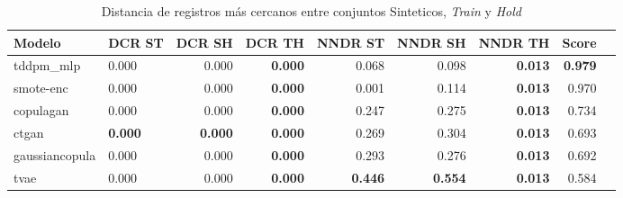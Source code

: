 \begin{table}[H]
\centering
\caption{Distancia de registros más cercanos entre conjuntos Sinteticos, \emph{Train} y \emph{Hold}}
\label{table-dcr-economicos-a-3}
\begin{tabular}{|l|l|r|r|r|r|r|r|r|}
\hline
\rowcolor[gray]{0.8}
Modelo & DCR ST & DCR SH & DCR TH & NNDR ST & NNDR SH & NNDR TH & \textbf{Score} \\
\hline tddpm\_mlp & 0.000 & \cellcolor[rgb]{0.9, 0.54, 0.52} 0.000 & \bfseries 0.000 & 0.068 & 0.098 & \bfseries 0.013 & \bfseries 0.979 \\
\hline smote-enc & \cellcolor[rgb]{0.9, 0.54, 0.52} 0.000 & 0.000 & \bfseries 0.000 & 0.001 & 0.114 & \bfseries 0.013 & 0.970 \\
\hline copulagan & 0.000 & 0.000 & \bfseries 0.000 & 0.247 & 0.275 & \bfseries 0.013 & 0.734 \\
\hline ctgan & \bfseries 0.000 & \bfseries 0.000 & \bfseries 0.000 & 0.269 & 0.304 & \bfseries 0.013 & 0.693 \\
\hline gaussiancopula & 0.000 & 0.000 & \bfseries 0.000 & 0.293 & 0.276 & \bfseries 0.013 & 0.692 \\
\hline tvae & 0.000 & 0.000 & \bfseries 0.000 & \bfseries 0.446 & \bfseries 0.554 & \bfseries 0.013 & 0.584 \\
\hline
\end{tabular}
\end{table}
